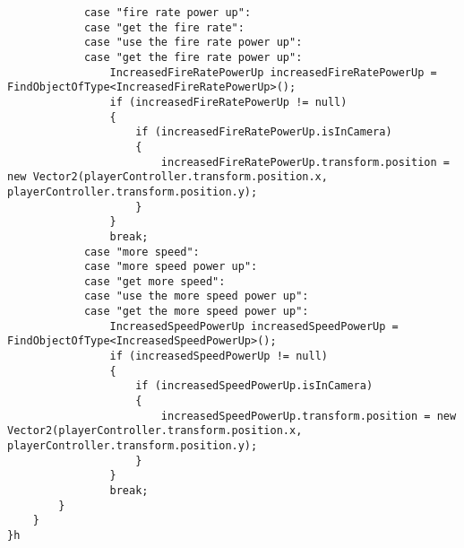 \documentclass{article}
\begin{document}
\begin{verbatim}
            case "fire rate power up":
            case "get the fire rate":
            case "use the fire rate power up":
            case "get the fire rate power up":
                IncreasedFireRatePowerUp increasedFireRatePowerUp = FindObjectOfType<IncreasedFireRatePowerUp>();
                if (increasedFireRatePowerUp != null)
                {
                    if (increasedFireRatePowerUp.isInCamera)
                    {
                        increasedFireRatePowerUp.transform.position = new Vector2(playerController.transform.position.x, playerController.transform.position.y);
                    }
                }
                break;
            case "more speed":
            case "more speed power up":
            case "get more speed":
            case "use the more speed power up":
            case "get the more speed power up":
                IncreasedSpeedPowerUp increasedSpeedPowerUp = FindObjectOfType<IncreasedSpeedPowerUp>();
                if (increasedSpeedPowerUp != null)
                {
                    if (increasedSpeedPowerUp.isInCamera)
                    {
                        increasedSpeedPowerUp.transform.position = new Vector2(playerController.transform.position.x, playerController.transform.position.y);
                    }
                }
                break;
        }
    }
}h
\end{verbatim}
\end{document}

